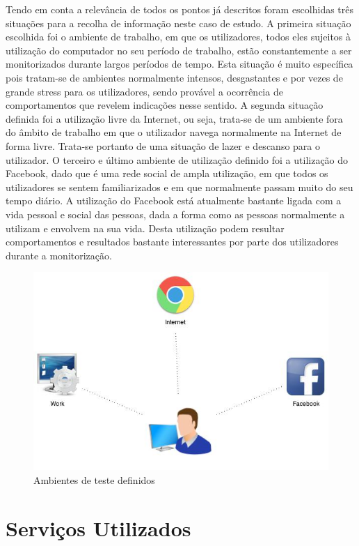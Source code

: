 Tendo em conta a relevância de todos os pontos já descritos foram escolhidas três situações para a recolha de informação neste caso de estudo. A primeira situação escolhida foi o ambiente de trabalho, em que os utilizadores, todos eles sujeitos à utilização do computador no seu período de trabalho, estão constantemente a ser monitorizados durante largos períodos de tempo. Esta situação é muito específica pois tratam-se de ambientes normalmente intensos, desgastantes e por vezes de grande stress para os utilizadores, sendo provável a ocorrência de comportamentos que revelem indicações nesse sentido. A segunda situação definida foi a utilização livre da Internet, ou seja, trata-se de um ambiente fora do âmbito de trabalho em que o utilizador navega normalmente na Internet de forma livre. Trata-se portanto de uma situação de lazer e descanso para o utilizador. O terceiro e último ambiente de utilização definido foi a utilização do Facebook, dado que é uma rede social de ampla utilização, em que todos os utilizadores se sentem familiarizados e em que normalmente passam muito do seu tempo diário. A utilização do Facebook está atualmente bastante ligada com a vida pessoal e social das pessoas, dada a forma como as pessoas normalmente a utilizam e envolvem na sua vida. Desta utilização podem resultar comportamentos e resultados bastante interessantes por parte dos utilizadores durante a monitorização.

\begin{figure}[htb]
   \centering
   \includegraphics[scale=0.5]{Images/ambientesestudo.jpg}
   \caption{Ambientes de teste definidos}
\end{figure}

\section{Serviços Utilizados}

